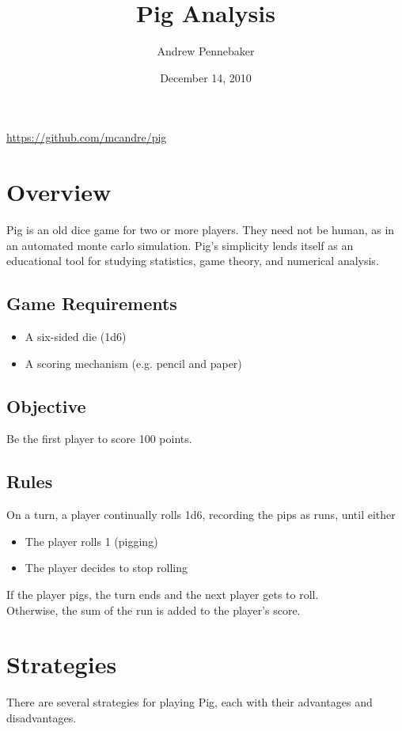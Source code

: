\documentclass{article}
\title{Pig Analysis}
\author{Andrew Pennebaker}
\date{December 14, 2010}
\begin{document}
\maketitle
\begin{center}
\url{https://github.com/mcandre/pig}
\end{center}

\section*{Overview}
Pig is an old dice game for two or more players. They need not be human, as in an automated monte carlo simulation. Pig's simplicity lends itself as an educational tool for studying statistics, game theory, and numerical analysis.

\subsection*{Game Requirements}
\begin{itemize}
\item A six-sided die (1d6)
\item A scoring mechanism (e.g. pencil and paper)
\end{itemize}

\subsection*{Objective}
Be the first player to score 100 points.

\subsection*{Rules}
On a turn, a player continually rolls 1d6, recording the pips as runs, until either
\begin{itemize}
\item The player rolls 1 (pigging)
\item The player decides to stop rolling
\end{itemize}
If the player pigs, the turn ends and the next player gets to roll.\\
Otherwise, the sum of the run is added to the player's score.

\section*{Strategies}
There are several strategies for playing Pig, each with their advantages and disadvantages.
\end{document}
